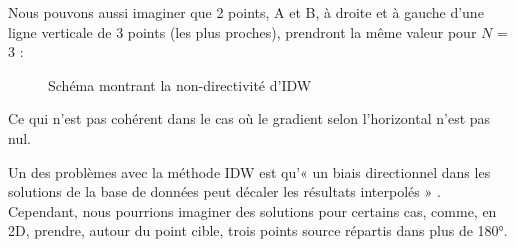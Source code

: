 Nous pouvons aussi imaginer que 2 points, A et B, à droite et à gauche d'une ligne verticale de 3 points (les plus proches), prendront la même valeur pour \( N \) = 3 :

\begin{figure}[H]
    \centering
    
    \caption{Schéma montrant la non-directivité d'IDW}
\end{figure}

    
Ce qui n'est pas cohérent dans le cas où le gradient selon l'horizontal n'est pas nul.

Un des problèmes avec la méthode IDW est qu'« un biais directionnel dans les solutions de la base de données peut décaler les résultats interpolés » \cite{palmer2009} \cite{idw-mapscaping}. Cependant, nous pourrions imaginer des solutions pour certains cas, comme, en 2D, prendre, autour du point cible, trois points source répartis dans plus de 180°. \cite{idw-update}  %


